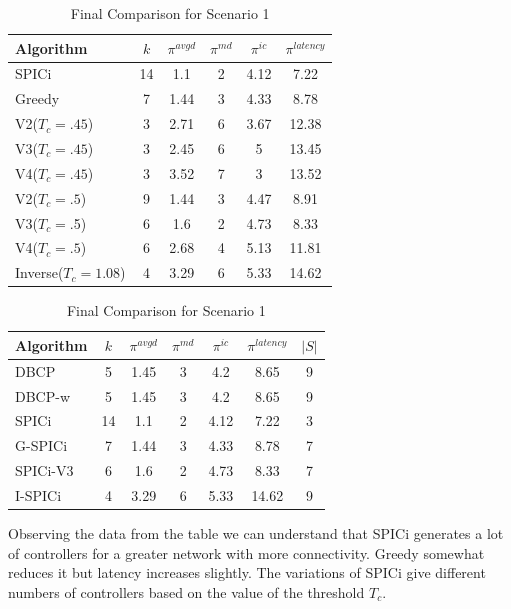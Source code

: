 \documentclass[8pt]{extarticle}
\begin{document}
	\begin{table}
		\caption{SPICi variations for Scenario 1}
		\begin{center}
			\begin{tabular}{|l|c|c|c|c|c|}
				\hline
				\textbf{Algorithm} & \textbf{$k$} & $\pi^{avgd}$ & \textbf{$\pi^{md}$} & \textbf{$\pi^{ic}$} & \textbf{$\pi^{latency}$} \\
				\hline
				SPICi & 14 & 1.1 & 2 & 4.12 & 7.22 \\
				Greedy & 7 & 1.44 & 3 & 4.33 & 8.78 \\
				V2($T_c=.45$) & 3 & 2.71 & 6 & 3.67 & 12.38 \\
				V3($T_c=.45$) & 3 & 2.45 & 6 & 5 & 13.45 \\
				V4($T_c=.45$) & 3 & 3.52 & 7 & 3 & 13.52 \\
				V2($T_c=.5$) & 9 & 1.44 & 3 & 4.47 & 8.91 \\
				V3($T_c=.$5) & 6 & 1.6 & 2 & 4.73 & 8.33 \\
				V4($T_c=.5$) & 6 & 2.68 & 4 & 5.13 & 11.81 \\
				Inverse($T_c=1.08$) & 4 & 3.29 & 6 & 5.33 & 14.62 \\
				\hline
			\end{tabular}
		\end{center}
		\caption{Final Comparison for Scenario 1}
		\begin{center}
			\begin{tabular}{|l|c|c|c|c|c|c|}
				\hline
				\textbf{Algorithm} & \textbf{$k$} & $\pi^{avgd}$ & \textbf{$\pi^{md}$} & \textbf{$\pi^{ic}$} & \textbf{$\pi^{latency}$} & \textbf{$|S|$} \\
				\hline
				DBCP & 5 & 1.45 & 3 & 4.2 & 8.65 & 9 \\
				DBCP-w & 5 & 1.45 & 3 & 4.2 & 8.65 & 9 \\
				SPICi & 14 & 1.1 & 2 & 4.12 & 7.22 & 3 \\
				G-SPICi & 7 & 1.44 & 3 & 4.33 & 8.78 & 7  \\
				SPICi-V3 & 6 & 1.6 & 2 & 4.73 & 8.33 & 7 \\
				I-SPICi & 4 & 3.29 & 6 & 5.33 & 14.62 & 9 \\
				\hline
			\end{tabular}
		\end{center}
	\end{table}

	
	Observing the data from the table we can understand that SPICi generates a lot of controllers for a greater network with more connectivity. Greedy somewhat reduces it but latency increases slightly. The variations of SPICi give different numbers of controllers based on the value of the threshold $T_c$.
	
\end{document}
